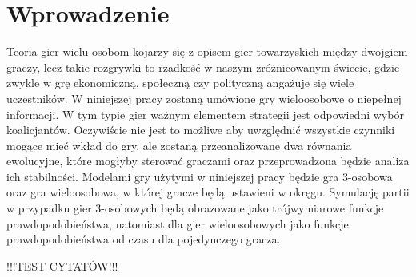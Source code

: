\chapter{Wprowadzenie}
\label{cha:wprowadzenie}

Teoria gier wielu osobom kojarzy się z opisem gier towarzyskich między dwojgiem graczy, lecz takie rozgrywki to rzadkość w naszym zróżnicowanym świecie, gdzie zwykle w grę ekonomiczną, społeczną czy polityczną angażuje się wiele uczestników. 
W niniejszej pracy zostaną umówione gry wieloosobowe o niepełnej informacji. W tym typie gier ważnym elementem strategii jest odpowiedni wybór koalicjantów. Oczywiście nie jest to możliwe aby uwzględnić wszystkie czynniki mogące mieć wkład do gry, ale zostaną przeanalizowane dwa równania ewolucyjne, które mogłyby sterować graczami oraz przeprowadzona będzie analiza ich stabilności. Modelami gry użytymi w niniejszej pracy będzie gra 3-osobowa oraz gra wieloosobowa, w której gracze będą ustawieni w okręgu. Symulację partii w przypadku gier 3-osobowych będą obrazowane jako trójwymiarowe funkcje prawdopodobieństwa, natomiast dla gier wieloosobowych jako funkcje prawdopodobieństwa od czasu dla pojedynczego gracza.


!!!TEST CYTATÓW!!! \cite{Now06} \cite{Hof98} \cite{Str01} \cite{Qt} \cite{Tut} \cite{Sza} \cite{Fsmd}